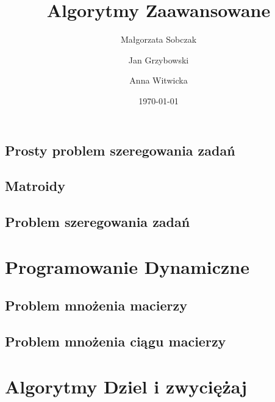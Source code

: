 \documentclass[11pt,a4paper]{article}
\begin{document}
                  

\title{Algorytmy Zaawansowane}
\author{Małgorzata Sobczak \and Jan Grzybowski \and Anna Witwicka}
\date{\today}

\maketitle 
                
\clearpage

\tableofcontents
\clearpage





\subsection{Prosty problem szeregowania zadań}


\subsection{Matroidy}


\subsection{Problem szeregowania zadań}


\section{Programowanie Dynamiczne}


\subsection{Problem mnożenia macierzy}


\subsection{Problem mnożenia ciągu macierzy}


\section{Algorytmy Dziel i zwyciężaj}

\end{document}
